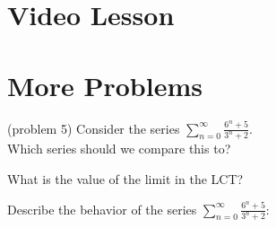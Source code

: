 \documentclass{ximera}
\begin{document}
\section{Video Lesson}

\begin{center}
\begin{foldable}
\end{foldable}
\end{center}


\section{More Problems}


\begin{problem}(problem 5)
Consider the series $\displaystyle{\sum_{n=0}^\infty \frac{6^n + 5}{3^n + 2}}$.\\
Which series should we compare this to?

\begin{multipleChoice}
\end{multipleChoice}

What is the value of the limit in the LCT?
\begin{multipleChoice}
\end{multipleChoice}

Describe the behavior of the series $\displaystyle{\sum_{n=0}^\infty \frac{6^n + 5}{3^n + 2}:}$
\begin{multipleChoice}
\end{multipleChoice}

\end{problem}
\end{document}
